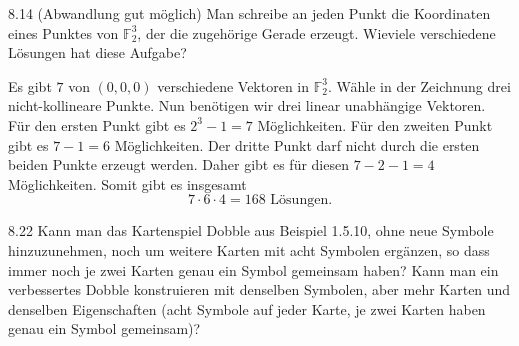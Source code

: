 \begin{exercise}{8.1}{4 (Abwandlung gut möglich)}
    Man schreibe an jeden Punkt die Koordinaten eines Punktes von $\mathbb{F}^3_2$,
    der die zugehörige Gerade erzeugt. Wieviele verschiedene Lösungen hat diese
    Aufgabe?
\end{exercise}
    \begin{center}
    \end{center}
    Es gibt $7$ von $(0,0,0)$ verschiedene Vektoren in $\mathbb{F}^3_2$.
    Wähle in der Zeichnung drei nicht-kollineare Punkte. Nun benötigen wir drei
    linear unabhängige Vektoren. Für den ersten Punkt gibt es $2^3-1 = 7$ Möglichkeiten.
    Für den zweiten Punkt gibt es $7-1 = 6$ Möglichkeiten. Der dritte Punkt darf
    nicht durch die ersten beiden Punkte erzeugt werden. Daher gibt es für diesen $7-2-1=4$
    Möglichkeiten. Somit gibt es insgesamt
    \[
    \boxed{7 \cdot 6 \cdot 4 = 168 \text{ Lösungen.}}
    \]
\begin{exercise}{8.2}{2}
    Kann man das Kartenspiel Dobble aus Beispiel 1.5.10,
    ohne neue Symbole hinzuzunehmen, noch um weitere Karten mit acht Symbolen
    ergänzen, so dass immer noch je zwei Karten genau ein Symbol gemeinsam haben?
    Kann man ein verbessertes Dobble konstruieren mit denselben Symbolen, aber
    mehr Karten und denselben Eigenschaften (acht Symbole auf jeder Karte, je zwei
    Karten haben genau ein Symbol gemeinsam)?
\end{exercise}
